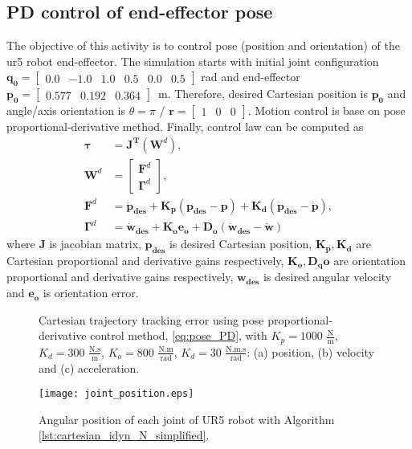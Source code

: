 \graphicspath{{images/act_3.1/}}
\subsection{PD control of end-effector pose}
The objective of this activity is to control pose (position and orientation) of the ur5 robot end-effector. The simulation starts with initial joint configuration $\mathbf{q_0}=\begin{bmatrix} 0.0 & -1.0 & 1.0 & 0.5 & 0.0 & 0.5 \end{bmatrix}$ rad and end-effector $\mathbf{p_0}=\begin{bmatrix}  0.577 &   0.192 &   0.364 \end{bmatrix}$~m. Therefore, desired Cartesian position is $\mathbf{p_0}$ and angle/axis orientation is  $\theta = \pi$ / $\mathbf{r}=\begin{bmatrix} 1 & 0 & 0 \end{bmatrix}$. Motion control is base on pose proportional-derivative method. Finally, control law can be computed as 
\begin{align}
	\boldsymbol{\tau} &= \mathbf{J^T} (\mathbf{W}^{d}), \label{eq:pose_PD}
	\\
	\mathbf{W}^{d} &=
	\begin{bmatrix}
	\mathbf{F}^{d} \\ \boldsymbol{\Gamma}^{d}
	\end{bmatrix}, 
	\nonumber \\
	\mathbf{F}^{d} &= \mathbf{\ddot{p}_{des}} + \mathbf{K_p (p_{des}-p)} + \mathbf{K_d (\dot{p}_{des}-\dot{p})}, 
	\nonumber \\
	\boldsymbol{\Gamma}^{d} &= \mathbf{\dot{w}_{des}} + \mathbf{K_o e_o} + \mathbf{D_o (\dot{w}_{des}-\dot{w})} \nonumber
\end{align}
\noindent where $\mathbf{J}$ is jacobian matrix, $\mathbf{p_{des}}$ is desired Cartesian position, $\mathbf{K_p, K_d}$ are Cartesian proportional and derivative gains respectively, $\mathbf{K_o, D_qo}$ are orientation proportional and derivative gains respectively, $\mathbf{w_{des}}$ is desired angular velocity and $\mathbf{e_o}$ is orientation error. \vspace{.5cm}






\begin{figure}%
	\centering
	\caption{Cartesian trajectory tracking error using pose proportional-derivative control method, \eqref{eq:pose_PD}, with  ${K_{p}}=1000$ $\mathrm{\frac{N}{m}}$, $K_{d}= 300$ $\mathrm{\frac{N.s}{m}}$, ${K_{o}}=800$ $\mathrm{\frac{N.m}{rad}}$, $K_{d}= 30$ $\mathrm{\frac{N.m.s}{rad}}$: (a) position, (b) velocity and (c) acceleration.}
	\label{fig:act_3.1_ee_position_error}
\end{figure}

\begin{figure}
    \centering
    \texttt{[image: joint\_position.eps]}	
    \caption{Angular position of each joint of UR5 robot with Algorithm \ref{lst:cartesian_idyn_N_simplified}.}
    \label{fig:act_3.1_joint_position_error}
\end{figure}